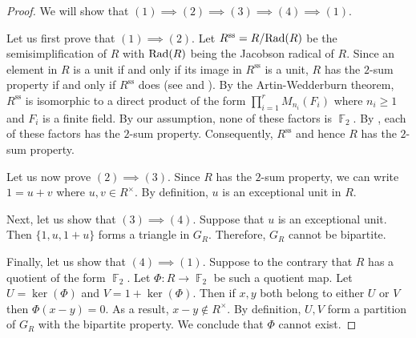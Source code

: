 \documentclass[11pt, a4paper]{amsart}
\theoremstyle{definition}
\DeclareMathOperator{\F}{\mathbb{F}}
\numberwithin{equation}{section}
\newcommand{\Rad}{{\rm Rad}}
\newcommand{\s}{\text{ss}}
\begin{document}
\begin{proof}
We will show that $(1) \implies (2) \implies (3) \implies (4) \implies (1).$

    Let us first prove that $(1) \implies (2).$ Let $R^{\s} =R/\Rad(R)$ be the semisimplification of $R$ with $\Rad(R)$ being the Jacobson radical of $R.$ Since an element in $R$ is a unit if and only if its image in $R^{\s}$ is a unit, $R$ has the $2$-sum property if and only if $R^{\s}$ does (see \cite[Proposition 3.40]{chudnovsky2024prime} and \cite[Proposition 1.3]{goldsmith1998unit}). By the Artin-Wedderburn theorem, $R^{\s}$ is isomorphic to a direct product of the form $\prod_{i=1}^r M_{n_i}(F_i)$ where $n_i \geq 1$ and $F_i$ is a finite field. By our assumption, none of these factors is $\F_2.$ By \cite{invertible_matrices}, each of these factors has the $2$-sum property. Consequently, $R^{\s}$ and hence $R$ has the $2$-sum property. 


Let us now prove $(2) \implies (3).$ Since $R$ has the $2$-sum property, we can write $1=u+v$ where $u, v \in R^{\times}.$ By definition, $u$ is an exceptional unit in $R.$ 


Next, let us show that $(3) \implies (4).$ Suppose that $u$ is an exceptional unit. Then $\{1, u, 1+u \}$ forms a triangle in $G_{R}.$ Therefore, $G_{R}$ cannot be bipartite. 

Finally, let us show that $(4) \implies (1).$ Suppose to the contrary that $R$ has a quotient of the form $\F_2.$ Let $\Phi\colon R \to \F_2$ be such a quotient map. Let $U = \ker(\Phi)$ and $V= 1 +\ker(\Phi).$ Then if $x, y$ both belong to either $U$ or $V$ then $\Phi(x-y)=0.$ As a result, $x-y \not \in R^{\times}.$ By definition, $U, V$ form a partition of $G_{R}$ with the bipartite property. We conclude that $\Phi$ cannot exist. 

    
\end{proof}
\end{document}

